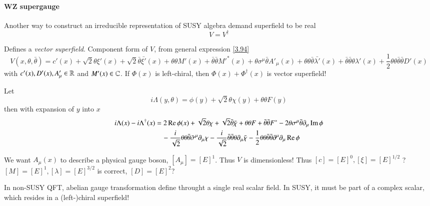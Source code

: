 \paragraph{WZ supergauge}
Another way to construct an irreducible representation of SUSY algebra demand superfield to be real
\begin{equation}
   V = V^\dagger \label{3.120p}
\end{equation}

Defines a \textit{vector superfield}. Component form of $V$, from general expression \eqref{3.94}
\begin{equation}
   V(x, \theta,\bar\theta) = c'(x) + \sqrt{2} \theta \xi'(x) + \sqrt{2} \bar\theta \bar{\xi'} (x) + \theta \theta M'(x) + \bar\theta\bar\theta M'^{*} (x) + \theta \sigma^\mu \bar\theta A'_\mu(x) + \theta\theta \bar\theta \bar{\lambda '} (x) + \bar\theta \bar\theta \theta \lambda'(x) + \frac{1}{2} \theta\theta\bar\theta \bar\theta D'(x) \label{3.121}
\end{equation}
with $c'(x), D'(x), A'_\mu \in \mathbb{R}$ and $M'(x) \in \mathbb{C}$.
If $\Phi(x)$ is left-chiral, then $\Phi(x) + \Phi^\dagger (x) $ is vector superfield!

Let  
\begin{equation}
 i \Lambda (y,\theta) = \phi(y) + \sqrt{2} \theta \chi(y) + \theta\theta F(y)  
\end{equation}
then with expansion of $y$ into $x$
\begin{align}
   i \Lambda(x) - i \Lambda^\dagger (x) &= 2 \Re \phi(x) + \sqrt{2} \theta \chi + \sqrt{2} \bar\theta \bar\chi + \theta \theta F + \bar\theta \bar\theta F^* - 2 \theta \sigma^\mu \bar\theta \partial_\mu \Im \phi \notag \\
                                        &\quad - \frac{i}{\sqrt{2}} \theta\theta \bar\theta \bar\sigma^\mu \partial_\mu \chi - \frac{i}{\sqrt{2}} \bar\theta \bar\theta \theta \partial_\mu \bar\chi - \frac{1}{2} \theta \theta \bar\theta \bar\theta \partial^\mu \partial_\mu \Re\phi \label{3.122}
\end{align}

We want $A_\mu(x)$ to describe a physical gauge boson, $[A_\mu] = [E]^1$. Thus $V$ is dimensionless! Thus $[c] = [E]^0, [\xi] = [E]^{1/2}$ ? $[M] = [E]^1, [\lambda] = [E]^{3/2}$ is correct, $[D] = [E]^2$?

In non-SUSY QFT, abelian gauge transformation define throught a single real scalar field. In SUSY, it must be part of a complex scalar, which resides in a (left-)chiral superfield!

